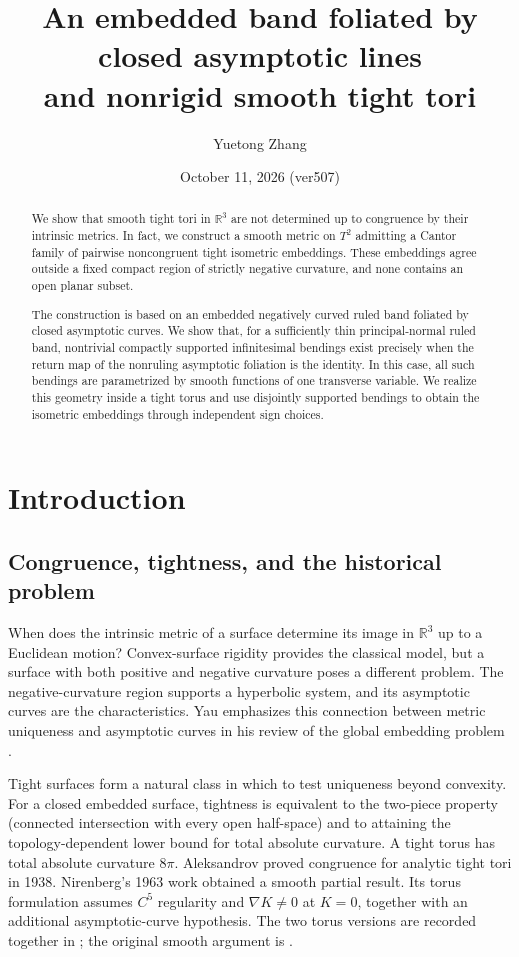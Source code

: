 \documentclass[11pt]{amsart}
\title[Closed asymptotic bands and tight tori]{An embedded band foliated by closed asymptotic lines\\and nonrigid smooth tight tori}
\author{Yuetong Zhang}
\date{October 11, 2026 (ver507)}
\theoremstyle{definition}
\theoremstyle{remark}
\newcommand{\R}{\mathbb R}\newcommand{\Sph}{\mathbb S}
\numberwithin{equation}{section}
\begin{document}
\begin{abstract}
We show that smooth tight tori in $\mathbb R^3$ are not determined up to congruence by their intrinsic metrics. In fact, we construct a smooth metric on $T^2$ admitting a Cantor family of pairwise noncongruent tight isometric embeddings. These embeddings agree outside a fixed compact region of strictly negative curvature, and none contains an open planar subset.

The construction is based on an embedded negatively curved ruled band foliated by closed asymptotic curves. We show that, for a sufficiently thin principal-normal ruled band, nontrivial compactly supported infinitesimal bendings exist precisely when the return map of the nonruling asymptotic foliation is the identity. In this case, all such bendings are parametrized by smooth functions of one transverse variable. We realize this geometry inside a tight torus and use disjointly supported bendings to obtain the isometric embeddings through independent sign choices.
\end{abstract}
\maketitle

\section{Introduction}\label{sec:intro}
\subsection{Congruence, tightness, and the historical problem}
When does the intrinsic metric of a surface determine its image in
$\R^3$ up to a Euclidean motion? Convex-surface rigidity provides the
classical model, but a surface with both positive and negative curvature
poses a different problem. The negative-curvature region supports a
hyperbolic system, and its asymptotic curves are the characteristics.
Yau emphasizes this connection between metric uniqueness and asymptotic
curves in his review of the global embedding problem
\cite[pp.~235--236]{YauReview}.

Tight surfaces form a natural class in which to test uniqueness beyond
convexity. For a closed embedded surface, tightness is equivalent to the
two-piece property (connected intersection with every open half-space)
and to attaining the topology-dependent lower bound
for total absolute curvature. A tight torus has total absolute curvature
$8\pi$. Aleksandrov proved congruence for analytic tight tori
in 1938. Nirenberg's 1963 work obtained a smooth partial result.
Its torus formulation assumes $C^5$ regularity and $\nabla K\ne0$ at
$K=0$, together with an additional asymptotic-curve hypothesis. The two
torus versions are recorded together in \cite[Theorem~1.6.1]{BK}; the original
smooth argument is \cite{Nirenberg}.
\end{document}
